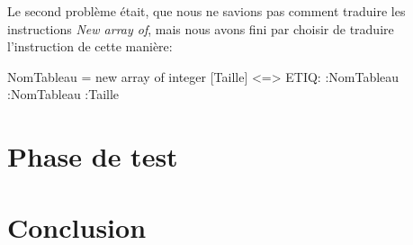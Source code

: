 \documentclass[10pt,a4paper]{article}
\begin{document}
Le second problème était, que nous ne savions pas comment traduire les instructions \textit{New array of}, mais nous avons fini par choisir de traduire l'instruction de cette manière:

NomTableau = new array of integer [Taille] <=> ETIQ:   :NomTableau :NomTableau :Taille



\section{Phase de test}


\newpage
\section{Conclusion}
\end{document}
